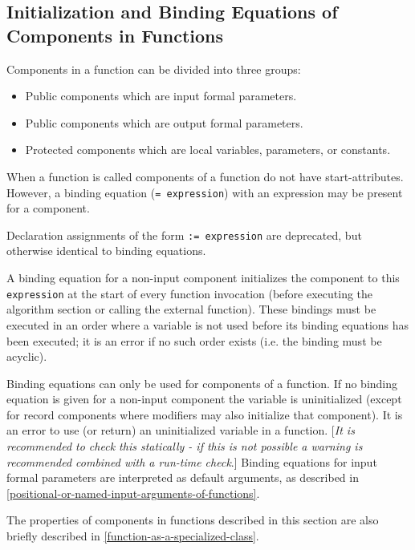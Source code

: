 \subsection{Initialization and Binding Equations of Components in Functions}

Components in a function can be divided into three groups:

\begin{itemize}
\item
  Public components which are input formal parameters.
\item
  Public components which are output formal parameters.
\item
  Protected components which are local variables, parameters, or
  constants.
\end{itemize}

When a function is called components of a function do not have
start-attributes. However, a binding equation (\lstinline!= expression!) with
an expression may be present for a component.
\begin{nonnormative}
Declaration assignments of the form \lstinline!:= expression! are deprecated, but otherwise identical to binding equations.
\end{nonnormative}

A binding equation for a non-input component initializes the
component to this \lstinline!expression! at the start of every function invocation
(before executing the algorithm section or calling the external
function). These bindings must be executed in an order where a variable
is not used before its binding equations has been executed; it is
an error if no such order exists (i.e. the binding must be acyclic).

Binding equations can only be used for components of a function.
If no binding equation is given for a non-input component the
variable is uninitialized (except for record components where modifiers
may also initialize that component). It is an error to use (or return)
an uninitialized variable in a function. {[}\emph{It is recommended to
check this statically - if this is not possible a warning is recommended
combined with a run-time check}.{]} Binding equations for input
formal parameters are interpreted as default arguments, as described in
\autoref{positional-or-named-input-arguments-of-functions}.

\begin{nonnormative}
The properties of components in functions described in this
section are also briefly described in \autoref{function-as-a-specialized-class}.
\end{nonnormative}

